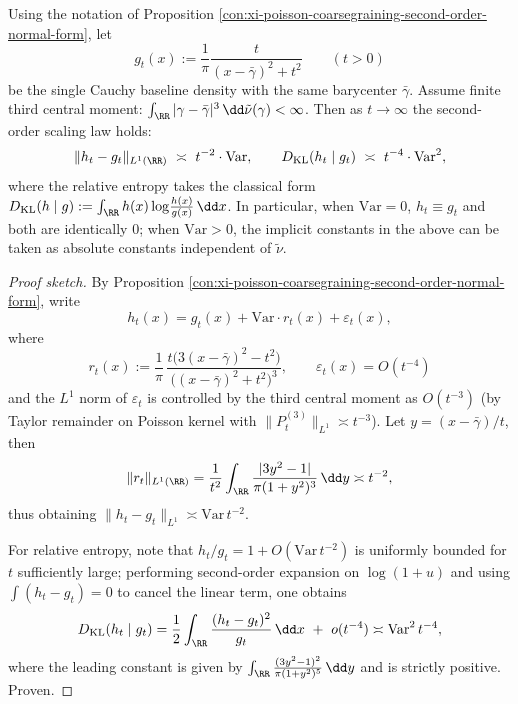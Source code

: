 \begin{proposition}\label{prop:xi-poisson-tv-kl-second-order}
Using the notation of Proposition \ref{con:xi-poisson-coarsegraining-second-order-normal-form}, let
\[
g_t(x):=\frac{1}{\pi}\frac{t}{(x-\bar\gamma)^2+t^2}
\qquad (t>0)
\]
be the single Cauchy baseline density with the same barycenter \(\bar\gamma\).
Assume finite third central moment:
\(
\int_{\RR}|\gamma-\bar\gamma|^3\,\dd\tilde\nu(\gamma)<\infty
\).
Then as \(t\to\infty\) the second-order scaling law holds:
\[
\|h_t-g_t\|_{L^1(\RR)}\ \asymp\ t^{-2}\cdot \mathrm{Var},
\qquad
D_{\mathrm{KL}}(h_t\mid g_t)\ \asymp\ t^{-4}\cdot \mathrm{Var}^2,
\]
where the relative entropy takes the classical form
\(
D_{\mathrm{KL}}(h\mid g):=\int_{\RR} h(x)\log\!\frac{h(x)}{g(x)}\,\dd x
\).
In particular, when \(\mathrm{Var}=0\), \(h_t\equiv g_t\) and both are identically \(0\); when \(\mathrm{Var}>0\), the implicit constants in the above can be taken as absolute constants independent of \(\tilde\nu\).
\end{proposition}
\begin{proof}[Proof sketch]
By Proposition \ref{con:xi-poisson-coarsegraining-second-order-normal-form}, write
\[
h_t(x)=g_t(x)+\mathrm{Var}\cdot r_t(x)+\varepsilon_t(x),
\]
where
\[
r_t(x):=\frac{1}{\pi}\,
\frac{t\bigl(3(x-\bar\gamma)^2-t^2\bigr)}{\bigl((x-\bar\gamma)^2+t^2\bigr)^3},
\qquad
\varepsilon_t(x)=O(t^{-4})
\]
and the \(L^1\) norm of \(\varepsilon_t\) is controlled by the third central moment as \(O(t^{-3})\) (by Taylor remainder on Poisson kernel with \(\|P_t^{(3)}\|_{L^1}\asymp t^{-3}\)).
Let \(y=(x-\bar\gamma)/t\), then
\[
\|r_t\|_{L^1(\RR)}=\frac{1}{t^2}\int_{\RR}\frac{|3y^2-1|}{\pi(1+y^2)^3}\,\dd y
\asymp t^{-2},
\]
thus obtaining \(\|h_t-g_t\|_{L^1}\asymp \mathrm{Var}\,t^{-2}\).
\par
For relative entropy, note that \(h_t/g_t=1+O(\mathrm{Var}\,t^{-2})\) is uniformly bounded for \(t\) sufficiently large;
performing second-order expansion on \(\log(1+u)\) and using \(\int(h_t-g_t)=0\) to cancel the linear term, one obtains
\[
D_{\mathrm{KL}}(h_t\mid g_t)
=\frac12\int_{\RR}\frac{(h_t-g_t)^2}{g_t}\,\dd x\ +\ o(t^{-4})
\asymp \mathrm{Var}^2\,t^{-4},
\]
where the leading constant is given by
\(
\int_{\RR}\frac{(3y^2-1)^2}{\pi(1+y^2)^5}\,\dd y
\)
and is strictly positive. Proven.
\end{proof}

\endinput
